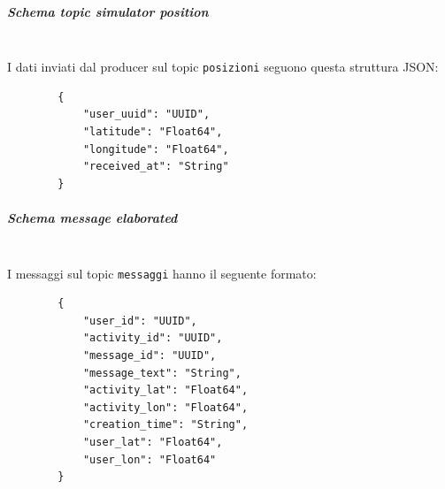 \documentclass[10pt]{article}
\newcommand{\mysubparagraph}[1]{\subparagraph{#1}\mbox{}\\}
\begin{document}
        \mysubparagraph{Schema topic simulator position}
        I dati inviati dal producer sul topic \texttt{posizioni} seguono questa struttura JSON: \\
        \begin{lstlisting}
        {
            "user_uuid": "UUID",
            "latitude": "Float64",
            "longitude": "Float64",
            "received_at": "String"
        }
        \end{lstlisting}

        \mysubparagraph{Schema message elaborated}
        I messaggi sul topic \texttt{messaggi} hanno il seguente formato: \\
        \begin{lstlisting}
        {
            "user_id": "UUID",
            "activity_id": "UUID",
            "message_id": "UUID",
            "message_text": "String",
            "activity_lat": "Float64",
            "activity_lon": "Float64",
            "creation_time": "String",
            "user_lat": "Float64",
            "user_lon": "Float64"
        }
        \end{lstlisting}
\end{document}
